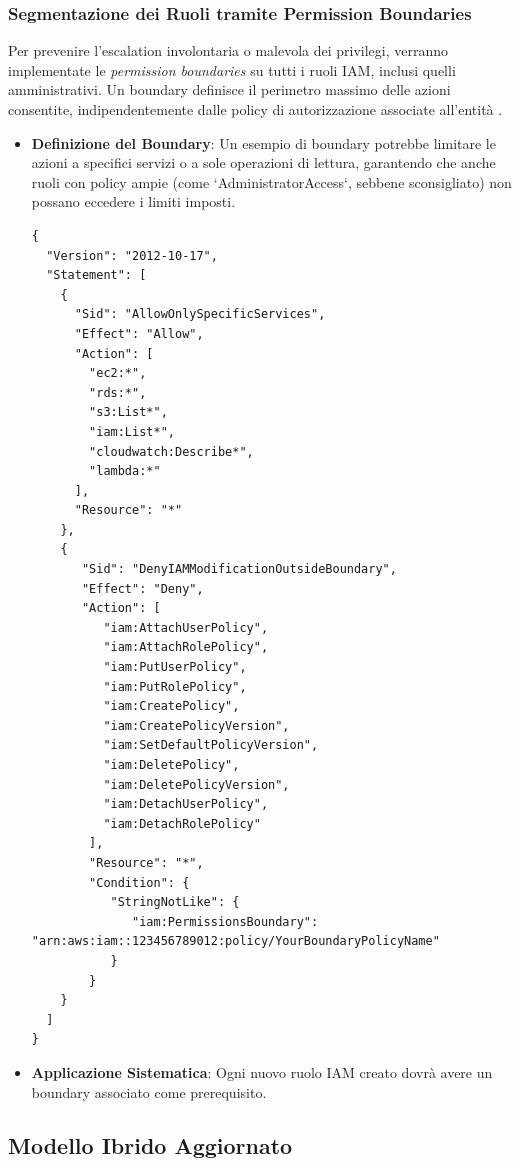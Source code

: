 \documentclass[a4paper,12pt]{report}
\begin{document}
\subsubsection{Segmentazione dei Ruoli tramite Permission Boundaries}

Per prevenire l'escalation involontaria o malevola dei privilegi, verranno implementate le \emph{permission boundaries} su tutti i ruoli IAM, inclusi quelli amministrativi. Un boundary definisce il perimetro massimo delle azioni consentite, indipendentemente dalle policy di autorizzazione associate all'entità \cite{aws:iam:boundaries}.
\begin{itemize}
    \item \textbf{Definizione del Boundary}: Un esempio di boundary potrebbe limitare le azioni a specifici servizi o a sole operazioni di lettura, garantendo che anche ruoli con policy ampie (come `AdministratorAccess`, sebbene sconsigliato) non possano eccedere i limiti imposti.
    \begin{lstlisting}[style=json, caption={Esempio di Permission Boundary restrittiva}, label=lst:permission-boundary]
{
  "Version": "2012-10-17",
  "Statement": [
    {
      "Sid": "AllowOnlySpecificServices",
      "Effect": "Allow",
      "Action": [
        "ec2:*",
        "rds:*",
        "s3:List*",
        "iam:List*",
        "cloudwatch:Describe*",
        "lambda:*"
      ],
      "Resource": "*"
    },
    {
       "Sid": "DenyIAMModificationOutsideBoundary",
       "Effect": "Deny",
       "Action": [
          "iam:AttachUserPolicy",
          "iam:AttachRolePolicy",
          "iam:PutUserPolicy",
          "iam:PutRolePolicy",
          "iam:CreatePolicy",
          "iam:CreatePolicyVersion",
          "iam:SetDefaultPolicyVersion",
          "iam:DeletePolicy",
          "iam:DeletePolicyVersion",
          "iam:DetachUserPolicy",
          "iam:DetachRolePolicy"
        ],
        "Resource": "*",
        "Condition": {
           "StringNotLike": {
              "iam:PermissionsBoundary": "arn:aws:iam::123456789012:policy/YourBoundaryPolicyName"
           }
        }
    }
  ]
}
    \end{lstlisting}
    \item \textbf{Applicazione Sistematica}: Ogni nuovo ruolo IAM creato dovrà avere un boundary associato come prerequisito.
\end{itemize}

\subsection{Modello Ibrido Aggiornato}
\label{subsec:modello_ibrido_aggiornato}
\end{document}
